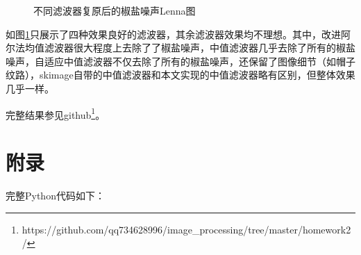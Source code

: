 \documentclass{article}
\begin{document}
\begin{figure}[ht]
{	}
	\caption{不同滤波器复原后的椒盐噪声Lenna图}
	\label{fig:sp-filter}
\end{figure}

如图\ref{fig:sp-filter}只展示了四种效果良好的滤波器，其余滤波器效果均不理想。其中，改进阿尔法均值滤波器很大程度上去除了了椒盐噪声，中值滤波器几乎去除了所有的椒盐噪声，自适应中值滤波器不仅去除了所有的椒盐噪声，还保留了图像细节（如帽子纹路），skimage自带的中值滤波器和本文实现的中值滤波器略有区别，但整体效果几乎一样。

完整结果参见github\footnote{https://github.com/qq734628996/image\_processing/tree/master/homework2/}。

\clearpage
\section*{附录}
\label{appendix}

完整Python代码如下：


\end{document}
